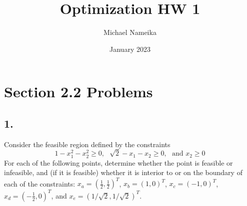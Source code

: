 \documentclass{article}
\title{Optimization HW 1}
\author{Michael Nameika}
\date{January 2023}
\begin{document}
\maketitle

\section*{Section 2.2 Problems}
\subsection*{1.} Consider the feasible region defined by the constraints 
\[1 - x_1^2 - x_2^2 \geq 0, \:\:\: \sqrt{2} - x_1 - x_2 \geq 0, \:\:\: \text{and     } x_2 \geq 0\]
For each of the following points, determine whether the point is feasible or infeasible, and (if it is feasible) whether it is interior to or on the boundary of each of the constraints: $x_a = (\frac{1}{2}, \frac{1}{2})^T$, $x_b = (1,0)^T$, $x_c = (-1,0)^T$, $x_d = (-\frac{1}{2}, 0)^T$, and $x_e = (1/\sqrt{2}, 1/\sqrt{2})^T$.
\newline\newline
\end{document}
